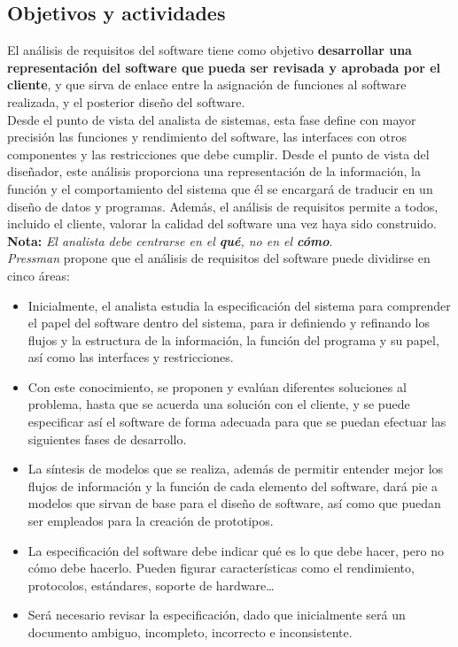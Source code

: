 \subsection{Objetivos y actividades}

El análisis de requisitos del software tiene como objetivo \textbf{desarrollar una representación del software que pueda ser revisada y aprobada por el cliente}, y que sirva de enlace entre la asignación de funciones al software realizada, y el posterior diseño del software.\\

Desde el punto de vista del analista de sistemas, esta fase define con mayor precisión las funciones y rendimiento del software, las interfaces con otros componentes y las restricciones que debe cumplir. Desde el punto de vista del diseñador, este análisis proporciona una representación de la información, la función y el comportamiento del sistema que él se encargará de traducir en un diseño de datos y programas. Además, el análisis de requisitos permite a todos, incluido el cliente, valorar la calidad del software una vez haya sido construido.\\

\textbf{Nota:} \textit{El analista debe centrarse en el \textbf{qué}, no en el \textbf{cómo}}.\\

\textit{Pressman} propone que el análisis de requisitos del software puede dividirse en cinco áreas:

\begin{itemize}
    \item Inicialmente, el analista estudia la especificación del sistema para comprender el papel del software dentro del sistema, para ir definiendo y refinando los flujos y la estructura de la información, la función del programa y su papel, así como las interfaces y restricciones.
    \item Con este conocimiento, se proponen y evalúan diferentes soluciones al problema, hasta que se acuerda una solución con el cliente, y se puede especificar así el software de forma adecuada para que se puedan efectuar las siguientes fases de desarrollo.
    \item La síntesis de modelos que se realiza, además de permitir entender mejor los flujos de información y la función de cada elemento del software, dará pie a modelos que sirvan de base para el diseño de software, así como que puedan ser empleados para la creación de prototipos.
    \item La especificación del software debe indicar qué es lo que debe hacer, pero no cómo debe hacerlo. Pueden figurar características como el rendimiento, protocolos, estándares, soporte de hardware\ldots
    \item Será necesario revisar la especificación, dado que inicialmente será un documento ambiguo, incompleto, incorrecto e inconsistente.
\end{itemize}


